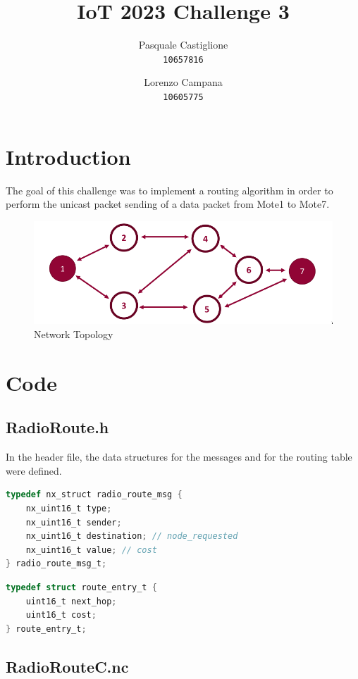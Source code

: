 \documentclass[11pt]{article}
\title{\textbf{IoT 2023 Challenge 3}}
\author{
  Pasquale Castiglione\\
	\texttt{10657816}
  \and
  Lorenzo Campana\\
  \texttt{10605775}
}
\date{}
\begin{document}
\maketitle

\section*{Introduction}
The goal of this challenge was to implement a routing algorithm in order to perform the unicast packet sending of a data packet from Mote1 to Mote7.
\begin{figure}[h]
\includegraphics[width=\textwidth]{topology.png}
\caption{Network Topology}
\end{figure}
\section*{Code}
\subsection*{RadioRoute.h}
In the header file, the data structures for the messages and for the routing table were defined.
\begin{lstlisting}[language=C,basicstyle=\footnotesize]
typedef nx_struct radio_route_msg {
	nx_uint16_t type;
	nx_uint16_t sender;
	nx_uint16_t destination; // node_requested
	nx_uint16_t value; // cost
} radio_route_msg_t;
\end{lstlisting}

\begin{lstlisting}[language=C,basicstyle=\footnotesize]
typedef struct route_entry_t {
	uint16_t next_hop;
  	uint16_t cost;
} route_entry_t;
\end{lstlisting}

\subsection*{RadioRouteC.nc}
\end{document}
